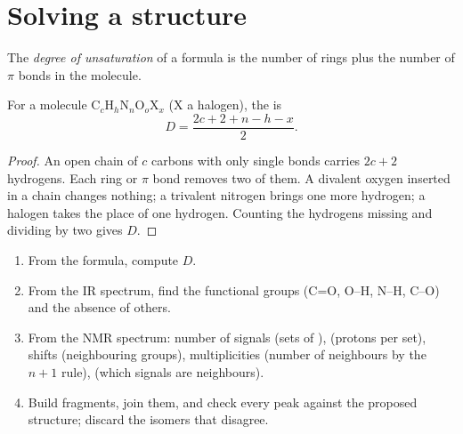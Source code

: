 \section{Solving a structure}

\begin{definition}\label{def:b1:structure-spectroscopy:unsaturation}
The \emph{degree of unsaturation} of a
formula is the number of rings plus the number of $\pi$ bonds in the
molecule.
\end{definition}

\begin{proposition}\label{prop:b1:structure-spectroscopy:unsaturation-formula}
For a molecule $\mathrm{C}_c\mathrm{H}_h\mathrm{N}_n\mathrm{O}_o\mathrm{X}_x$
(X a halogen), the  is
\[
  D = \frac{2c + 2 + n - h - x}{2} .
\]
\end{proposition}

\begin{proof}
An open chain of $c$ carbons with only single bonds carries $2c + 2$
hydrogens. Each ring or $\pi$ bond removes two of them. A divalent oxygen
inserted in a chain changes nothing; a trivalent nitrogen brings one more
hydrogen; a halogen takes the place of one hydrogen. Counting the
hydrogens missing and dividing by two gives $D$.
\end{proof}

\begin{method}\label{met:b1:structure-spectroscopy:solve-structure}
\begin{enumerate}
  \item From the formula, compute $D$.
  \item From the IR spectrum, find the functional groups (C=O, O--H, N--H,
        C--O) and the absence of others.
  \item From the NMR spectrum: number of signals (sets of ),  (protons per set), shifts (neighbouring
        groups), multiplicities (number of neighbours by the $n + 1$
        rule),  (which signals are neighbours).
  \item Build fragments, join them, and check every peak against the
        proposed structure; discard the isomers that disagree.
\end{enumerate}
\end{method}

